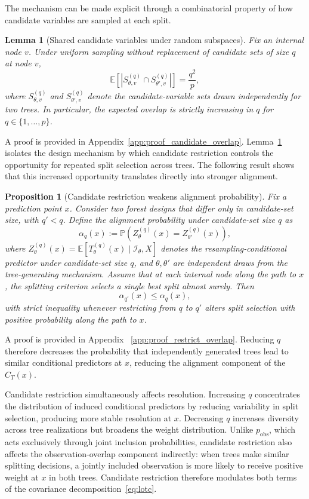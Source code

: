 \documentclass[11pt]{article}
\theoremstyle{plain}
\newtheorem{proposition}{Proposition}
\newtheorem{lemma}{Lemma}
\theoremstyle{definition}
\theoremstyle{remark}
\begin{document}
The mechanism can be made explicit through a combinatorial property of how candidate variables are sampled at each split. 

\begin{lemma}[Shared candidate variables under random subspaces]
	\label{lem:cand_overlap}
	Fix an internal node $v$. Under uniform sampling without replacement of candidate sets of size $q$ at node $v$,
	\[
	\mathbb E\!\left[
	\left|S_{\theta,v}^{(q)}\cap S_{\theta',v}^{(q)}\right|
	\right]
	=
	\frac{q^2}{p},
	\]
	where $S_{\theta,v}^{(q)}$ and $S_{\theta',v}^{(q)}$ denote the candidate-variable sets drawn independently for two trees. In particular, the expected overlap is strictly increasing in $q$ for $q\in\{1,\dots,p\}$.
\end{lemma}

A proof is provided in Appendix~\ref{app:proof_candidate_overlap}. Lemma~\ref{lem:cand_overlap} isolates the design mechanism by which candidate restriction controls the opportunity for repeated split selection across trees. The following result shows that this increased opportunity translates directly into stronger alignment.

\begin{proposition}[Candidate restriction weakens alignment probability]
	\label{prop:restrict_alignment}
	Fix a prediction point $x$. Consider two forest designs that differ only in candidate-set size, with $q'<q$. Define the alignment probability under candidate-set size $q$ as
	\[
	\alpha_q(x) := \mathbb P\!\left(Z_\theta^{(q)}(x) = Z_{\theta'}^{(q)}(x)\right),
	\]
	where $Z_\theta^{(q)}(x) = \mathbb E[T_\theta^{(q)}(x) \mid \mathcal I_\theta, X]$ denotes the resampling-conditional predictor under candidate-set size $q$, and $\theta, \theta'$ are independent draws from the tree-generating mechanism. Assume that at each internal node along the path to $x$, the splitting criterion selects a single best split almost surely. Then
	\[
	\alpha_{q'}(x)\le \alpha_q(x),
	\]
	with strict inequality whenever restricting from $q$ to $q'$ alters split selection with positive probability along the path to $x$.
\end{proposition}

A proof is provided in Appendix ~\ref{app:proof_restrict_overlap}. Reducing $q$ therefore decreases the probability that independently generated trees lead to similar conditional predictors at $x$, reducing the alignment component of the $C_T(x)$.

Candidate restriction simultaneously affects resolution. Increasing $q$ concentrates the distribution of induced conditional predictors by reducing variability in split selection, producing more stable resolution at $x$. Decreasing $q$ increases diversity across tree realizations but broadens the weight distribution. Unlike $p_{\mathrm{obs}}$, which acts exclusively through joint inclusion probabilities, candidate restriction also affects the observation-overlap component indirectly: when trees make similar splitting decisions, a jointly included observation is more likely to receive positive weight at $x$ in both trees. Candidate restriction therefore modulates both terms of the covariance decomposition~\eqref{eq:lotc}.
\end{document}
